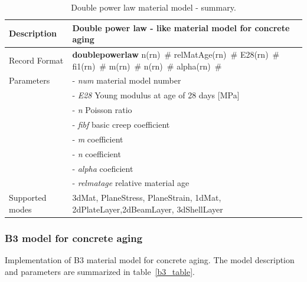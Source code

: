 \documentclass[epsf,a4paper]{article}
\newcommand{\descitem}[1]{{\noindent \bf #1}}
\newcommand{\elemparam}[2]{{{#1\tiny (#2)}~\#}}
\newcommand{\param}[1]{{\it #1}}
\begin{document}
\begin{table}[h]                                                                
\begin{tabular}{|l|p{9cm}|}                                                      
\hline                                                                          
Description & Double power law - like material model  for concrete aging\\
\hline                                                                          
Record Format & \descitem{doublepowerlaw}  \elemparam{n}{rn}
\elemparam{relMatAge}{rn} \elemparam{E28}{rn} \elemparam{fi1}{rn} \elemparam{m}{rn}
\elemparam{n}{rn} \elemparam{alpha}{rn} \\
Parameters &- \param{num} material model number\\
&- \param{E28} Young modulus at age of 28 days [MPa]\\
&- \param{n} Poisson ratio\\
&- \param{fibf} basic creep coefficient\\
&- \param{m} coefficient \\
&- \param{n} coefficient \\
&- \param{alpha} coeficient \\
&- \param{relmatage} relative material age \\
Supported modes& 3dMat, PlaneStress, PlaneStrain, 1dMat,
2dPlateLayer,2dBeamLayer, 3dShellLayer\\
\hline
\end{tabular}                                                                   
\caption{Double power law material model - summary.}                
\label{doublepowerlaw_table}                                                         
\end{table}                                                                     

\subsubsection{B3 model for concrete aging}
Implementation of B3 material model for concrete aging.
The model description and parameters are summarized
in table~\ref{b3_table}.
\end{document}
